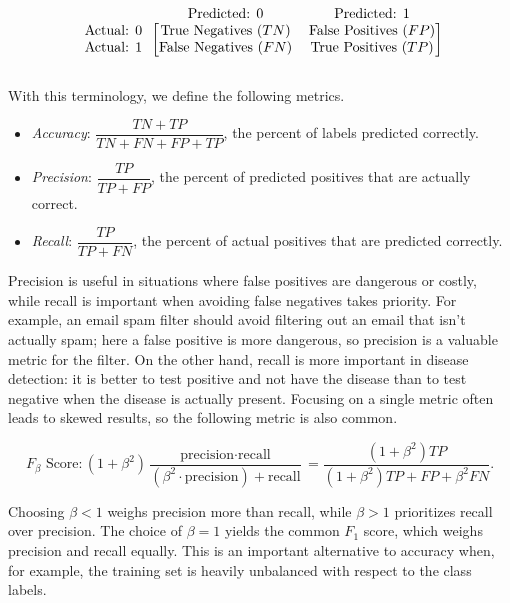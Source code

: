 \begin{align*}
\begin{blockarray}{ccc}
& \textrm{Predicted: }0 & \textrm{Predicted: }1 \\
\begin{block}{c[cc]}
\textrm{Actual: }0 & \textrm{True Negatives } (TN) & \textrm{False Positives } (FP)\\
\textrm{Actual: }1 & \textrm{False Negatives } (FN) & \textrm{True Positives } (TP)\\
\end{block}\end{blockarray}
\end{align*}

With this terminology, we define the following metrics.
\begin{itemize}
\item \emph{Accuracy}: $\dfrac{TN + TP}{TN + FN + FP + TP}$, the percent of labels predicted correctly.
\item \emph{Precision}: $\dfrac{TP}{TP + FP}$, the percent of predicted positives that are actually correct. %
\item \emph{Recall}: $\dfrac{TP}{TP + FN}$, the percent of actual positives that are predicted correctly. %
\end{itemize}

Precision is useful in situations where false positives are dangerous or costly, while recall is important when avoiding false negatives takes priority.
For example, an email spam filter should avoid filtering out an email that isn't actually spam; here a false positive is more dangerous, so precision is a valuable metric for the filter.
On the other hand, recall is more important in disease detection: it is better to test positive and not have the disease than to test negative when the disease is actually present.
Focusing on a single metric often leads to skewed results, so the following metric is also common.

\begin{equation*}
F_\beta \text{ Score}: (1 + \beta^2)
\dfrac{\text{precision}\cdot\text{recall}}{(\beta^2\cdot\text{precision}) + \text{recall}} = \dfrac{(1 + \beta^2)TP}{(1+\beta^2)TP + FP + \beta^2 FN}.
\end{equation*}

Choosing $\beta < 1$ weighs precision more than recall, while $\beta > 1$ prioritizes recall over precision.
The choice of $\beta = 1$ yields the common $F_1$ score, which weighs precision and recall equally.
This is an important alternative to accuracy when, for example, the training set is heavily unbalanced with respect to the class labels.

